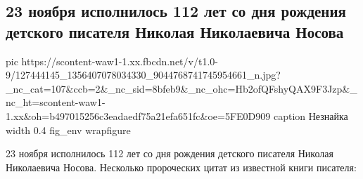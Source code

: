  
 
 
 

 
 
\subsection{23 ноября исполнилось 112 лет со дня рождения детского писателя Николая Николаевича Носова}
\label{sec:24_11_2020.fb.maslov_evgenij.1.nikolaj_nosov}


\ifcmt
pic https://scontent-waw1-1.xx.fbcdn.net/v/t1.0-9/127444145_1356407078034330_9044768741745954661_n.jpg?_nc_cat=107&ccb=2&_nc_sid=8bfeb9&_nc_ohc=Hb2ofQFshyQAX9F3Jzp&_nc_ht=scontent-waw1-1.xx&oh=b497015256c3eadaedf75a21efa651fc&oe=5FE0D909
caption Незнайка
width 0.4
fig_env wrapfigure
\fi

23 ноября исполнилось 112 лет со дня рождения детского писателя Николая Николаевича Носова.
Несколько пророческих цитат из известной книги писателя:


